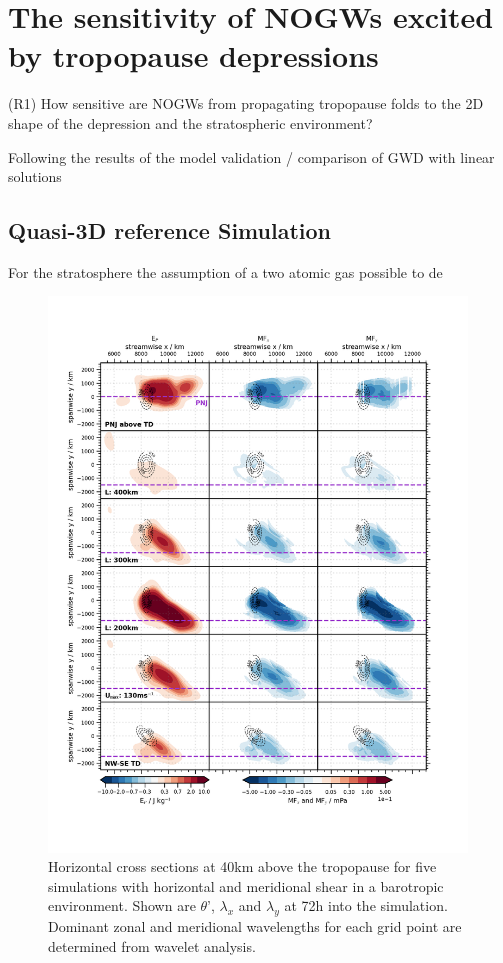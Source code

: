 \chapter{The sensitivity of NOGWs excited by tropopause depressions}
\label{sec:resultsQ3D}


\begin{tcolorbox}[]
    (R1) How sensitive are NOGWs from propagating tropopause folds to the 2D shape of the depression and the stratospheric environment?
\end{tcolorbox}


Following the results of the model validation / comparison of GWD with linear solutions




\section{Quasi-3D reference Simulation}
\label{sec:resultsq3D-reference}


For the stratosphere the assumption of a two atomic gas  possible to de
\begin{figure}[tbp]
    \centering
    \includegraphics[width=0.99\textwidth]{figures_3D/waveletAna_fluxes_obs.png}
    \caption{Horizontal cross sections at 40km above the tropopause for five simulations with horizontal and meridional shear in a barotropic environment. Shown are $\theta$', $\lambda_x$ and $\lambda_y$ at 72h into the simulation. Dominant zonal and meridional wavelengths for each grid point are determined from wavelet analysis.}
\end{figure}

